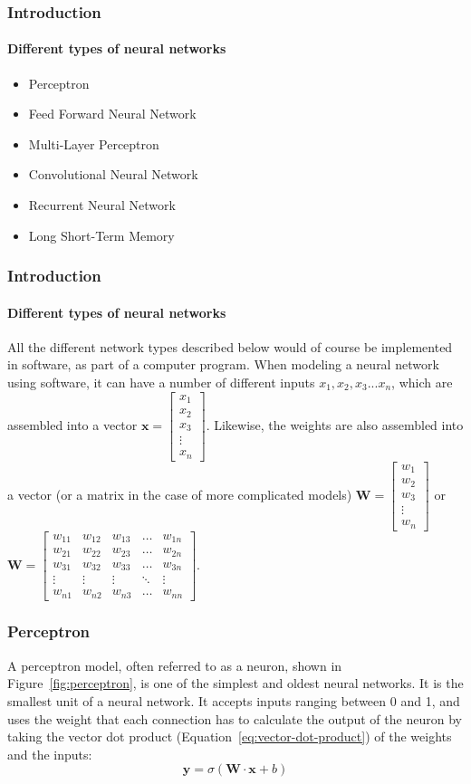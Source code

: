 \documentclass{beamer}
\begin{document}
\begin{frame}
\frametitle{Introduction}
\framesubtitle{Different types of neural networks}
\begin{itemize}
    \item Perceptron
    \item Feed Forward Neural Network
    \item Multi-Layer Perceptron
    \item Convolutional Neural Network
    \item Recurrent Neural Network
    \item Long Short-Term Memory
\end{itemize} 
\end{frame}

\begin{frame}
\frametitle{Introduction}
\framesubtitle{Different types of neural networks}
All the different network types described below would of course be implemented in software, as part of a computer program. When modeling a neural network using software, it can have a number of different inputs $x_1, x_2, x_3 ... x_n$, which are assembled into a vector $\textbf{x}=\begin{bmatrix}x_1\\x_2\\x_3\\\vdots\\x_n\end{bmatrix}$. Likewise, the weights are also assembled into a vector (or a matrix in the case of more complicated models) $\textbf{W}=\begin{bmatrix}w_1\\w_2\\w_3\\\vdots\\w_n\end{bmatrix}$ or $\textbf{W}=\begin{bmatrix}w_{11}&w_{12}&w_{13}&\dots&w_{1n}\\w_{21}&w_{22}&w_{23}&\dots&w_{2n}\\w_{31}&w_{32}&w_{33}&\dots&w_{3n}\\\vdots&\vdots&\vdots&\ddots&\vdots\\w_{n1}&w_{n2}&w_{n3}&\dots&w_{nn}\end{bmatrix}$.
\subsubsection{Perceptron}
A perceptron model, often referred to as a neuron, shown in Figure~\ref{fig:perceptron}, is one of the simplest and oldest neural networks. It is the smallest unit of a neural network. It accepts inputs ranging between 0 and 1, and uses the weight that each connection has to calculate the output of the neuron by taking the vector dot product (Equation~\ref{eq:vector-dot-product}) of the weights and the inputs:
\begin{equation}
    \textbf{y} = \sigma(\textbf{W}\cdot\textbf{x} + b)
    \label{eq:perceptron}
\end{equation}
\end{frame}
\end{document}

